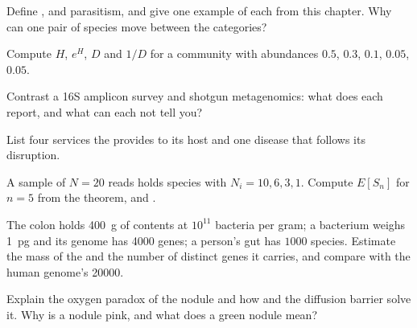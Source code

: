 \begin{exercise}[$\star$]\label{exo:b3:microbiomes:1}
Define ,  and parasitism, and give one example of
each from this chapter. Why can one pair of species move between the
categories?
\end{exercise}

\begin{exercise}[$\star$]\label{exo:b3:microbiomes:2}
Compute $H$, $e^{H}$, $D$ and $1/D$ for a community with abundances
$0.5$, $0.3$, $0.1$, $0.05$, $0.05$.
\end{exercise}

\begin{exercise}[$\star$]\label{exo:b3:microbiomes:3}
Contrast a 16S amplicon survey and shotgun metagenomics: what does each
report, and what can each not tell you?
\end{exercise}

\begin{exercise}[$\star$]\label{exo:b3:microbiomes:4}
List four services the  provides to its host and one
disease that follows its disruption.
\end{exercise}

\begin{exercise}[$\star\star$]\label{exo:b3:microbiomes:5}
A sample of $N = 20$ reads holds species with $N_{i} = 10, 6, 3, 1$.
Compute $E[S_{n}]$ for $n = 5$ from the theorem, and .
\end{exercise}

\begin{exercise}[$\star\star$]\label{exo:b3:microbiomes:6}
The colon holds \qty{400}{g} of contents at $10^{11}$ bacteria per
gram; a bacterium weighs \qty{1}{pg} and its genome has \num{4000}
genes; a person's gut has $1000$ species. Estimate the mass of the
 and the number of distinct genes it carries, and compare
with the human genome's \num{20000}.
\end{exercise}

\begin{exercise}[$\star\star$]\label{exo:b3:microbiomes:7}
Explain the oxygen paradox of the nodule and how  and the
diffusion barrier solve it. Why is a nodule pink, and what does a green
nodule mean?
\end{exercise}

